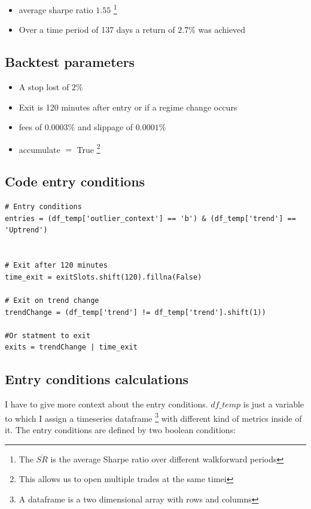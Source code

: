 \documentclass[12pt]{article}
\begin{document}
\begin{itemize}
    \item average sharpe ratio $1.55$ \footnote{The $\overline{SR}$ is the average Sharpe ratio over different walkforward periods}
    \item Over a time period of 137 days a return of $2.7\%$ was achieved
\end{itemize}


\subsection{Backtest parameters}

\begin{itemize}
    \item A stop lost of $2\%$ 
    \item Exit is 120 minutes after entry or if a regime change occurs
    \item fees of $0.0003\%$ and slippage of $0.0001\%$ 
    \item accumulate $=$ True \footnote{This allows us to open multiple trades at the same timei}
\end{itemize}


\subsection{Code entry conditions}

\begin{verbatim}
# Entry conditions
entries = (df_temp['outlier_context'] == 'b') & (df_temp['trend'] == 'Uptrend')


# Exit after 120 minutes
time_exit = exitSlots.shift(120).fillna(False)    

# Exit on trend change
trendChange = (df_temp['trend'] != df_temp['trend'].shift(1))  

#Or statment to exit 
exits = trendChange | time_exit
\end{verbatim}




\newpage
\subsection{Entry conditions calculations}
I have to give more context about the entry conditions. $df\_temp$ is just a variable to which I assign a timeseries dataframe \footnote{A dataframe is a two dimensional array with rows and columns} with different kind of metrics inside of it. The entry conditions are defined by two boolean conditions:
\end{document}
